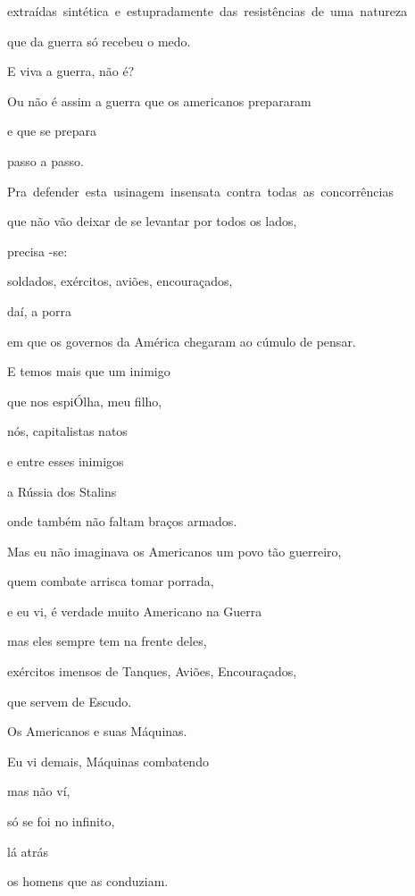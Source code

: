 \mbox{extraídas sintética e estupradamente das resistências de uma natureza}

que da guerra só recebeu o medo.

E viva a guerra, não é?

Ou não é assim a guerra que os americanos prepararam

e que se prepara

passo a passo.

\mbox{Pra defender esta usinagem insensata contra todas as concorrências}

que não vão deixar de se levantar por todos os lados,

precisa -se:

soldados, exércitos, aviões, encouraçados, 

daí, a porra 

em que os governos da América chegaram ao cúmulo de pensar.


E temos mais que um inimigo

que nos espiÓlha, meu filho,

nós, capitalistas natos

e entre esses inimigos

a Rússia dos Stalins

onde também não faltam braços armados.

Mas eu não imaginava os Americanos um povo tão guerreiro,

quem combate arrisca tomar porrada,

e eu vi, é verdade muito Americano na Guerra

mas eles sempre tem na frente deles,

exércitos imensos de Tanques, Aviões, Encouraçados,

que servem de Escudo.

Os Americanos e suas Máquinas. 

Eu vi demais, Máquinas combatendo

mas não ví,

só se foi no infinito, 

lá atrás

os homens que as conduziam.


